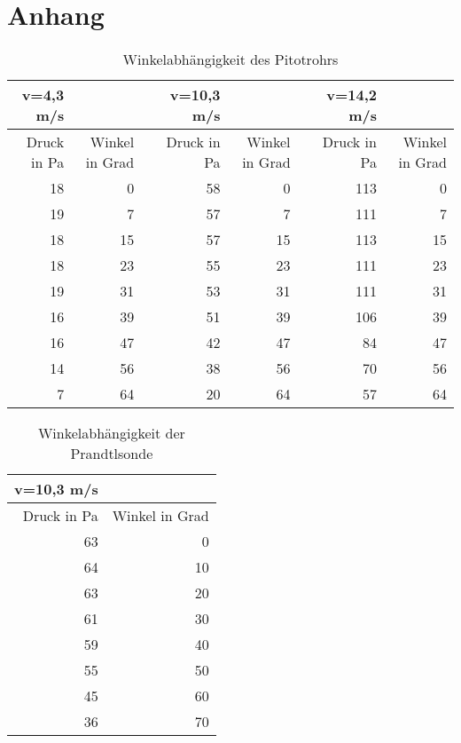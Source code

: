 \section{Anhang}
\begin{table}[htbp]
  \centering
  \caption{Winkelabhängigkeit des Pitotrohrs}
    \begin{tabular}{rrrrrrrr}
    \toprule
    v=4,3 m/s &       &       & v=10,3 m/s &       &       & v=14,2 m/s &  \\
    \midrule
    Druck in Pa & Winkel in Grad &       & Druck in Pa & Winkel in Grad &       & Druck in Pa & Winkel in Grad \\
    18    & 0     &       & 58    & 0     &       & 113   & 0 \\
    19    & 7     &       & 57    & 7     &       & 111   & 7 \\
    18    & 15    &       & 57    & 15    &       & 113   & 15 \\
    18    & 23    &       & 55    & 23    &       & 111   & 23 \\
    19    & 31    &       & 53    & 31    &       & 111   & 31 \\
    16    & 39    &       & 51    & 39    &       & 106   & 39 \\
    16    & 47    &       & 42    & 47    &       & 84    & 47 \\
    14    & 56    &       & 38    & 56    &       & 70    & 56 \\
    7     & 64    &       & 20    & 64    &       & 57    & 64 \\
    \bottomrule
    \end{tabular}%
  \label{tab:Winkel}%
\end{table}%

\begin{table}[htbp]
  \centering
  \caption{Winkelabhängigkeit der Prandtlsonde}
    \begin{tabular}{rr}
    \toprule
    v=10,3 m/s &  \\
    \midrule
    Druck in Pa & Winkel in Grad \\
    63    & 0 \\
    64    & 10 \\
    63    & 20 \\
    61    & 30 \\
    59    & 40 \\
    55    & 50 \\
    45    & 60 \\
    36    & 70 \\
    \bottomrule
    \end{tabular}%
  \label{tab:Winkelnormalrohr}%
\end{table}%

